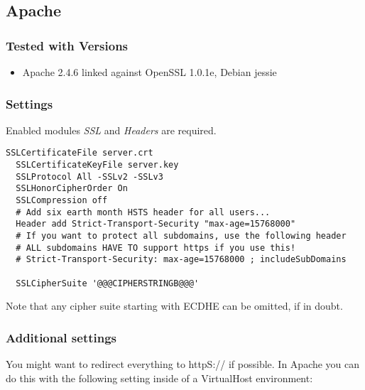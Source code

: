 
\subsection{Apache}

\subsubsection{Tested with Versions} 
\begin{itemize}
\item Apache 2.4.6 linked against OpenSSL 1.0.1e, Debian jessie
\end{itemize}


\subsubsection{Settings} 

Enabled modules \emph{SSL} and \emph{Headers} are required.

\begin{lstlisting}[breaklines]
  SSLCertificateFile server.crt
  SSLCertificateKeyFile server.key
  SSLProtocol All -SSLv2 -SSLv3 
  SSLHonorCipherOrder On
  SSLCompression off
  # Add six earth month HSTS header for all users...
  Header add Strict-Transport-Security "max-age=15768000"
  # If you want to protect all subdomains, use the following header
  # ALL subdomains HAVE TO support https if you use this!
  # Strict-Transport-Security: max-age=15768000 ; includeSubDomains

  SSLCipherSuite '@@@CIPHERSTRINGB@@@'

\end{lstlisting}

Note that any cipher suite starting with ECDHE can be omitted, if in doubt.

\subsubsection{Additional settings}

You might want to redirect everything to httpS:// if possible. In Apache you can do this with the following setting inside of a VirtualHost environment:

